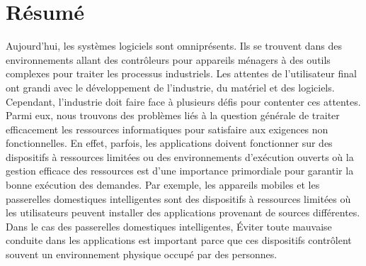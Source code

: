\vspace{-2cm}
\chapter*{Résumé}

Aujourd'hui, les systèmes logiciels sont omniprésents. Ils se trouvent dans des environnements allant des contrôleurs pour appareils ménagers à des outils complexes pour traiter les processus industriels. Les attentes de l'utilisateur final ont grandi avec le développement de l'industrie, du matériel et des logiciels. Cependant, l'industrie doit faire face à plusieurs défis pour contenter ces attentes. Parmi eux, nous trouvons des problèmes liés à la question générale de traiter efficacement les ressources informatiques pour satisfaire aux exigences non fonctionnelles. En effet, parfois, les applications doivent fonctionner sur des dispositifs à ressources limitées ou des environnements d'exécution ouverts où la gestion efficace des ressources est d'une importance primordiale pour garantir la bonne exécution des demandes. Par exemple, les appareils mobiles et les passerelles domestiques intelligentes sont des dispositifs à ressources limitées où les utilisateurs peuvent installer des applications provenant de sources différentes. Dans le cas des passerelles domestiques intelligentes, Éviter toute mauvaise conduite dans les applications est important parce que ces dispositifs contrôlent souvent un environnement physique occupé par des personnes.


